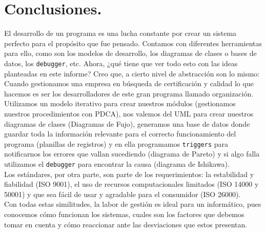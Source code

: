 \documentclass[spanish, fleqn]{article}
\begin{document}
	\section{Conclusiones.}
	El desarrollo de un programa es una lucha constante por crear un sistema 
	perfecto para el propósito que fue pensado. Contamos con diferentes 
	herramientas para ello, como son los modelos de desarrollo, los diagramas
	de clases o bases de datos, los \texttt{debugger}, etc. Ahora, ¿qué tiene
	que ver todo esto con las ideas planteadas en este informe? Creo que, a
	cierto nivel de abstracción son lo mismo: Cuando gestionamos una empresa en
	búsqueda de certificación y calidad lo que hacemos es ser los 
	desarrolladores de este gran programa llamado organización. Utilizamos un
	modelo iterativo para crear nuestros módulos (gestionamos nuestros
	procedimientos con PDCA), nos valemos del UML para crear nuestros diagramas
	de clases (Diagramas de Fujo), generamos una base de datos donde guardar
	toda la información relevante para el correcto funcionamiento del programa
	(planillas de registros) y en ella programamos \texttt{triggers} para 
	notificarnos los errores que vallan sucediendo (diagrama de Pareto) y si
	algo falla utilizamos el \texttt{debugger} para encontrar la causa 
	(diagrama de Ishikawa).\\
	Los estándares, por otra parte, son parte de los requerimientos: la 
	estabilidad y fiabilidad (ISO 9001), el uso de recursos computacionales 
	limitados (ISO 14000 y 50001) y que sea fácil de usar y agradable para
	el consumidor (ISO 26000).\\
	Con todas estas similitudes, la labor de gestión es ideal para un
	informático, pues conocemos cómo funcionan los sistemas, cuales son los
	factores que debemos tomar en cuenta y cómo reaccionar ante las 
	desviaciones que estos presentan.
\end{document}
